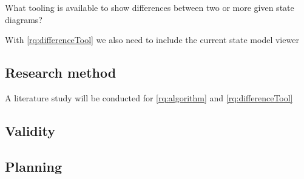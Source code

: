 \begin{questions}[resume]
    \item What tooling is available to show differences between two or more given state diagrams? \label{rq:differenceTool}
\end{questions}

With \ref{rq:differenceTool} we also need to include the current state model viewer \cite{thesisMulders}






\subsection{Research method}

A literature study will be conducted for \ref{rq:algorithm} and \ref{rq:differenceTool}


\subsection{Validity}

\subsection{Planning}